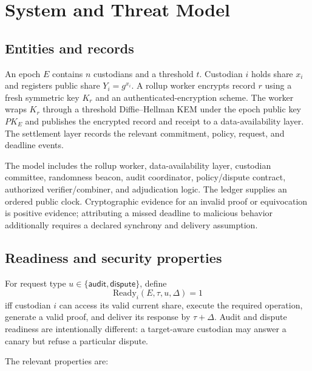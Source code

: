 \documentclass[10pt]{article}
\begin{document}
\section{System and Threat Model}

\subsection{Entities and records}

An epoch $E$ contains $n$ custodians and a threshold $t$. Custodian $i$ holds share $x_i$ and registers public share $Y_i=g^{x_i}$. A rollup worker encrypts record $r$ using a fresh symmetric key $K_r$ and an authenticated-encryption scheme. The worker wraps $K_r$ through a threshold Diffie--Hellman KEM under the epoch public key $PK_E$ and publishes the encrypted record and receipt to a data-availability layer. The settlement layer records the relevant commitment, policy, request, and deadline events.

The model includes the rollup worker, data-availability layer, custodian committee, randomness beacon, audit coordinator, policy/dispute contract, authorized verifier/combiner, and adjudication logic. The ledger supplies an ordered public clock. Cryptographic evidence for an invalid proof or equivocation is positive evidence; attributing a missed deadline to malicious behavior additionally requires a declared synchrony and delivery assumption.

\subsection{Readiness and security properties}

For request type $u\in\{\mathsf{audit},\mathsf{dispute}\}$, define
\[
\mathrm{Ready}_i(E,\tau,u,\Delta)=1
\]
iff custodian $i$ can access its valid current share, execute the required operation, generate a valid proof, and deliver its response by $\tau+\Delta$. Audit and dispute readiness are intentionally different: a target-aware custodian may answer a canary but refuse a particular dispute.

The relevant properties are:
\end{document}
